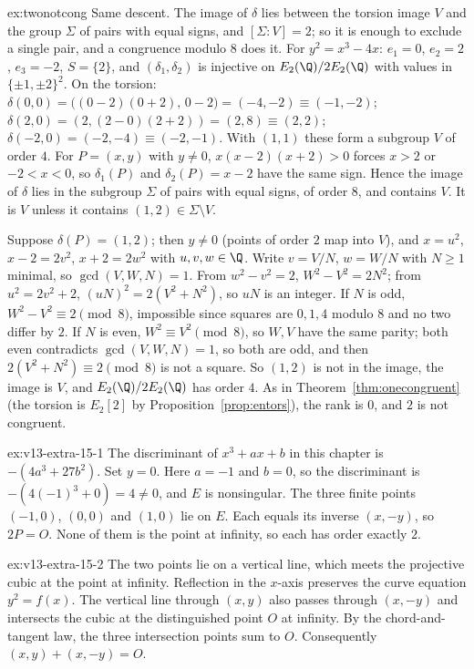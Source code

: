 \begin{solution}{ex:twonotcong}
\idea Same descent. The image of $\delta$ lies between the torsion image $V$ and the group $\Sigma$ of pairs with equal signs, and $[\Sigma:V]=2$; so it is enough to
exclude a single pair, and a congruence modulo $8$ does it.
\writeup For $y^2=x^3-4x$: $e_1=0$, $e_2=2$, $e_3=-2$, $S=\{2\}$, and $(\delta_1,\delta_2)$ is injective on $E_2(\Q)/2E_2(\Q)$ with values in $\{\pm1,\pm2\}^2$. On the torsion:
$\delta(0,0)=\bigl((0-2)(0+2),\,0-2\bigr)=(-4,-2)\equiv(-1,-2)$; $\delta(2,0)=(2,(2-0)(2+2))=(2,8)\equiv(2,2)$; $\delta(-2,0)=(-2,-4)\equiv(-2,-1)$. With $(1,1)$ these form
a subgroup $V$ of order $4$. For $P=(x,y)$ with $y\ne0$, $x(x-2)(x+2)>0$ forces $x>2$ or $-2<x<0$, so $\delta_1(P)$ and $\delta_2(P)=x-2$ have the same sign. Hence the
image of $\delta$ lies in the subgroup $\Sigma$ of pairs with equal signs, of order $8$, and contains $V$. It is $V$ unless it contains $(1,2)\in\Sigma\setminus V$.

Suppose $\delta(P)=(1,2)$; then $y\ne0$ (points of order $2$ map into $V$), and $x=u^2$, $x-2=2v^2$, $x+2=2w^2$ with $u,v,w\in\Q$. Write $v=V/N$, $w=W/N$ with
$N\ge1$ minimal, so $\gcd(V,W,N)=1$. From $w^2-v^2=2$, $W^2-V^2=2N^2$; from $u^2=2v^2+2$, $(uN)^2=2(V^2+N^2)$, so $uN$ is an integer. If $N$ is odd, $W^2-V^2\equiv2\pmod8$,
impossible since squares are $0,1,4$ modulo $8$ and no two differ by $2$. If $N$ is even, $W^2\equiv V^2\pmod8$, so $W,V$ have the same parity; both even contradicts
$\gcd(V,W,N)=1$, so both are odd, and then $2(V^2+N^2)\equiv2\pmod8$ is not a square. So $(1,2)$ is not in the image, the image is $V$, and $E_2(\Q)/2E_2(\Q)$ has order $4$.
As in Theorem~\ref{thm:onecongruent} (the torsion is $E_2[2]$ by Proposition~\ref{prop:entors}), the rank is $0$, and $2$ is not congruent.
\end{solution}

\begin{solution}{ex:v13-extra-15-1}
\idea The discriminant of $x^3+ax+b$ in this chapter is $-(4a^3+27b^2)$. Set $y=0$.
\writeup Here $a=-1$ and $b=0$, so the discriminant is $-(4(-1)^3+0)=4\ne0$, and $E$ is nonsingular. The three finite points $(-1,0)$, $(0,0)$ and $(1,0)$ lie on $E$. Each equals its inverse $(x,-y)$, so $2P=O$. None of them is the point at infinity, so each has order exactly $2$.
\end{solution}

\begin{solution}{ex:v13-extra-15-2}
\idea The two points lie on a vertical line, which meets the projective cubic at the point at infinity.
\writeup Reflection in the $x$-axis preserves the curve equation $y^2=f(x)$. The vertical line through $(x,y)$ also passes through $(x,-y)$ and intersects the cubic at the distinguished point $O$ at infinity. By the chord-and-tangent law, the three intersection points sum to $O$. Consequently $(x,y)+(x,-y)=O$.
\end{solution}

